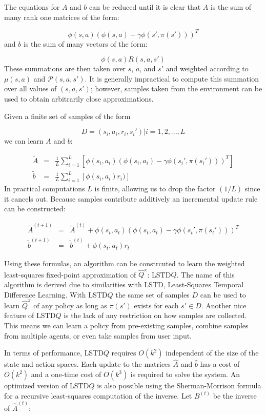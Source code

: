 The equations for $A$ and $b$ can be reduced until it is clear that $A$ is the sum of many rank one matrices of the form:

\[
    \phi(s,a)(\phi(s,a) - \gamma\phi(s',\pi(s')))^T
\]
and $b$ is the sum of many vectors of the form:

\[
    \phi(s,a)R(s,a,s')
\]
These summations are then taken over $s$, $a$, and $s'$ and weighted according to $\mu(s,a)$ and $\mathcal{P}(s,a,s')$. It is generally impractical to compute this summation over all values of $(s,a,s')$; however, samples taken from the environment can be used to obtain arbitrarily close approximations.

Given a finite set of samples of the form

\[
    D = { (s_i,a_i,r_i,s_i') | i = 1,2,...,L}
\]
we can learn $A$ and $b$:

\[
    \begin{array}{rcl}
        \tilde{A} &=& \frac{1}{L}\displaystyle\sum_{i=1}^L[\phi(s_i,a_i)(\phi(s_i,a_i) - \gamma\phi(s_i',\pi(s_i')))^T] \\
        \tilde{b} &=& \frac{1}{L}\displaystyle\sum_{i=1}^L[\phi(s_i,a_i)r_i)]
    \end{array}
\]
In practical computations $L$ is finite, allowing us to drop the factor $(1/L)$ since it cancels out. Because samples contribute additively an incremental update rule can be constructed:

\[
    \begin{array}{rcl}
        \tilde{A}^{(t+1)} &=& \tilde{A}^{(t)} + \phi(s_t,a_t)(\phi(s_t,a_t) - \gamma\phi(s_t',\pi(s_t')))^T \\
        \tilde{b}^{(t+1)} &=& \tilde{b}^{(t)} + \phi(s_t,a_t)r_t
    \end{array}
\]

Using these formulas, an algorithm can be constrcuted to learn the weighted least-squares fixed-point approximation of $\hat{Q}^\pi$: LSTD$Q$. The name of this algorithm is derived due to similarities with LSTD, Least-Squares Temporal Difference Learning. With LSTD$Q$ the same set of samples $D$ can be used to learn $\hat{Q}^\pi$ of any policy as long as $\pi(s')$ exists for each $s' \in D$. Another nice feature of LSTD$Q$ is the lack of any restriction on how samples are collected. This means we can learn a policy from pre-existing samples, combine samples from multiple agents, or even take samples from user input.

In terms of performance, LSTD$Q$ requires $O(k^2)$ independent of the size of the state and action spaces. Each update to the matrices $\hat{A}$ and $\hat{b}$ has a cost of $O(k^2)$ and a one-time cost of $O(k^3)$ is required to solve the system. An optimized version of LSTD$Q$ is also possible using the Sherman-Morrison formula for a recursive least-squares computation of the inverse. Let $B^{(t)}$ be the inverse of $\hat{A}^{(t)}$:

